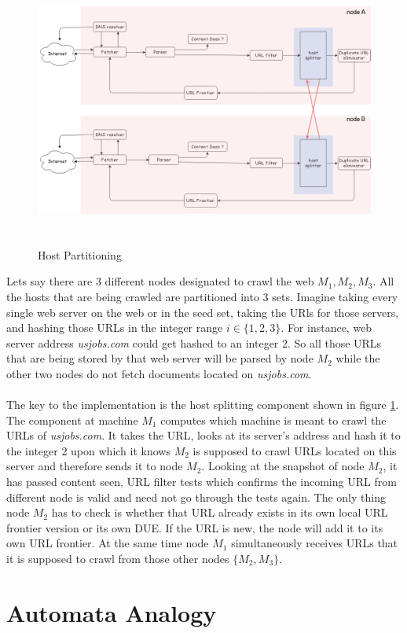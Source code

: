 \begin{figure}[h!]
  \centering
  \includegraphics[width=15cm,height=9cm,keepaspectratio]{../media/crawler/host-splitterv3.png}
  \caption{Host Partitioning}
  \label{fig:hpart}
\end{figure}

\noindent
Lets say there are 3 different nodes designated to crawl the web $M_1, M_2, M_3$. All
the hosts that are being crawled are partitioned into 3 sets. Imagine taking every
single web server on the web or in the seed set, taking the URls for those servers, and hashing those URLs in the integer range $i \in \{1,2,3\}$. For instance, web
server address \textit{usjobs.com} could get hashed to an integer 2. So all those URLs that are being stored by that web server will be parsed by node $M_2$ while the other two nodes do not fetch documents located on \textit{usjobs.com}.
\\
\\
The key to the implementation is the host splitting component shown in figure \ref{fig:hpart}. The component at machine $M_1$ computes which machine is meant to crawl
the URLs of \textit{usjobs.com}. It takes the URL, looks at its server's address and
hash it to the integer 2 upon which it knows $M_2$ is supposed to crawl URLs located
on this server and therefore sends it to node $M_2$. Looking at the snapshot of node $M_2$, it has passed content seen, URL filter tests which confirms the incoming URL
from different node is valid and need not go through the tests again. The only thing node $M_2$ has to check is whether that URL already exists in its own local URL frontier version or its own DUE. If the URL is new, the node will add it to its own URL
frontier. At the same time node $M_1$ simultaneously receives URLs that it is supposed to crawl from those other nodes $\{M_2, M_3\}$.
\pagebreak

\section{Automata Analogy}